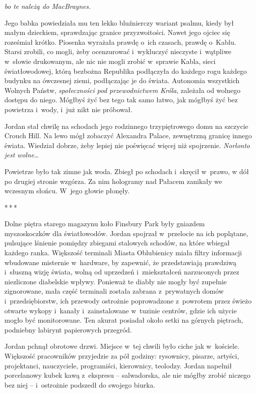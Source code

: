 \documentclass[oneside,polish,11pt,sfheadings]{mwbk}
\newcommand{\threeast}{\bigskip\par\centerline{*\,*\,*}\medskip\par}%
\begin{document}
\emph{bo te należą do MacBraynes.}

Jego babka powiedziała mu ten lekko bluźnierczy wariant psalmu, kiedy
był małym dzieckiem, sprawdzając granice przyzwoitości. Nawet jego
ojciec się roześmiał krótko. Piosenka wyrażała prawdę o~ich czasach,
prawdę o~Kablu. Starsi zrobili, co mogli, żeby ocenzurować i~wykluczyć
nieczyste i~wątpliwe w~słowie drukowanym, ale nic nie mogli zrobić w~sprawie Kabla, sieci światłowodowej, którą bezbożna Republika podłączyła
do każdego rogu każdego budynku na ówczesnej ziemi, podłączając je do
świata. Autonomia wszystkich Wolnych Państw, \emph{społeczności pod
przewodnictwem Króla}, zależała od wolnego dostępu do niego. Mógłbyś żyć
bez tego tak samo łatwo, jak mógłbyś żyć bez powietrza i~wody, i~już
nikt nie próbował.

Jordan stał chwilę na schodach jego rodzinnego trzypiętrowego domu na
szczycie Crouch Hill. Na lewo mógł zobaczyć Alexandra Palace, zewnętrzną
granicę innego świata. Wiedział dobrze, żeby lepiej nie poświęcać więcej
niż spojrzenie. \emph{Norlonto jest wolne}\ldots

Powietrze było tak zimne jak woda. Zbiegł po schodach i~skręcił w~prawo,
w dół po drugiej stronie wzgórza. Za nim hologramy nad Pałacem zanikały
we wczesnym słońcu. W~jego głowie płonęły.
  \threeast 

Dolne piętra starego magazynu koło Finsbury Park były gniazdem
myszoskoczków dla światłowodów. Jordan spojrzał w~przelocie na ich
poplątane, pulsujące lśnienie pomiędzy zbiegami stalowych schodów, na
które wbiegał każdego ranka. Większość terminali Miasta Oblubienicy
miała filtry informacji wbudowane misternie w~hardware, by zapewnić, że
przedstawiają prawdziwą i~słuszną wizję świata, wolną od uprzedzeń i~zniekształceń narzuconych przez niezliczone diabelskie wpływy. Ponieważ
te diabły nie mogły być zupełnie zignorowane, mała część terminali
została zabrana z~prywatnych domów i~przedsiębiorstw, ich przewody
ostrożnie poprowadzone z~powrotem przez świeżo otwarte wykopy i~kanały i~zainstalowane w~tuzinie centrów, gdzie ich użycie mogło być
monitorowane. Ten akurat posiadał około setki na górnych piętrach,
podniebny labirynt papierowych przegród.

Jordan pchnął obrotowe drzwi. Miejsce w~tej chwili było ciche jak w~kościele. Większość pracowników przyjedzie za pół godziny: rysownicy,
pisarze, artyści, projektanci, nauczyciele, programiści, kierownicy,
teolodzy. Jordan napełnił porcelanowy kubek kawą z~ekspresu --
salwadorska, ale nie mógłby zrobić niczego bez niej -- i~ostrożnie
podszedł do swojego biurka.
\end{document}
